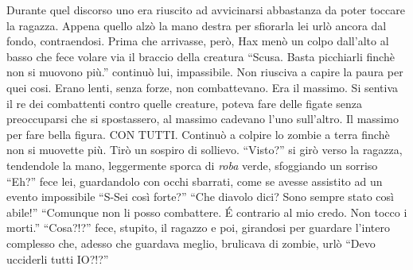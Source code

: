     Durante quel discorso uno era riuscito ad avvicinarsi abbastanza da
    poter toccare la ragazza. Appena quello alzò la mano destra per
    sfiorarla lei urlò ancora dal fondo, contraendosi. Prima che arrivasse,
    però, Hax menò un colpo dall'alto al basso che fece volare via il
    braccio della creatura ``Scusa. Basta picchiarli finchè non si muovono
    più.'' continuò lui, impassibile. Non riusciva a capire la paura per
    quei cosi. Erano lenti, senza forze, non combattevano. Era il massimo.
    Si sentiva il re dei combattenti contro quelle creature, poteva fare
    delle figate senza preoccuparsi che si spostassero, al massimo cadevano
    l'uno sull'altro. Il massimo per fare bella figura. CON TUTTI. Continuò
    a colpire lo zombie a terra finchè non si muovette più. Tirò un sospiro
    di sollievo. ``Visto?'' si girò verso la ragazza, tendendole la mano,
    leggermente sporca di \emph{roba} verde, sfoggiando un sorriso ``Eh?''
    fece lei, guardandolo con occhi sbarrati, come se avesse assistito ad
    un evento impossibile ``S-Sei così forte?'' ``Che diavolo dici? Sono
    sempre stato così abile!'' ``Comunque non li posso combattere. \'E
    contrario al mio credo. Non tocco i morti.'' ``Cosa?!?'' fece, stupito,
    il ragazzo e poi, girandosi per guardare l'intero complesso che, adesso
    che guardava meglio, brulicava di zombie, urlò ``Devo ucciderli tutti
    IO?!?''

